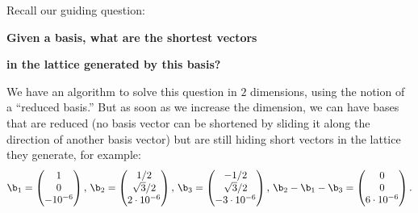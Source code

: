 

Recall our guiding question:
\begin{center}
	\textbf{Given a basis, what are the shortest vectors}
	
	\textbf{in the lattice generated by this basis?}
\end{center}

We have an algorithm to solve this question in $2$ dimensions, using the notion of a ``reduced basis.'' But as soon as we increase the dimension, we can have bases that are reduced (no basis vector can be shortened by sliding it along the direction of another basis vector) but are still hiding short vectors in the lattice they generate, for example:
	\[\b_1=\begin{pmatrix}
	1\\0\\-10^{-6}
	\end{pmatrix},\,\b_2=\begin{pmatrix}
	1/2 \\ \sqrt{3}/2 \\ 2\cdot 10^{-6}
	\end{pmatrix},\,\b_3=\begin{pmatrix}
	-1/2 \\ \sqrt{3}/2 \\ -3\cdot 10^{-6}
	\end{pmatrix},\,\b_2-\b_1-\b_3=\begin{pmatrix}
	0 \\ 0 \\ 6\cdot 10^{-6}
	\end{pmatrix}.\]

